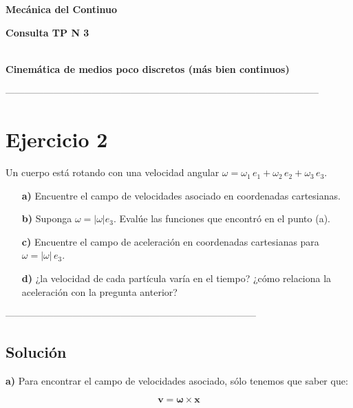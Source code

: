 \documentclass[10pt,a4paper]{article}
\begin{document}
\begin{center}
\bf{Mecánica del Continuo} \vspace*{0.2cm} \linebreak
\vspace{0.050cm}
\begin{Large}\bf{Consulta TP N 3} \end{Large} \vspace*{0.2cm}\\ \bf{Cinemática de medios poco discretos (más bien continuos)}
 \end{center}
\begin{center}
--------------------------------------------------------------------------------------------------
\end{center} 

\section*{Ejercicio 2}


Un cuerpo está rotando con una velocidad angular $\omega = \omega_1 \, e_1 + \omega_2 \, e_2 + \omega_3 \,e_3$.

\begin{itemize}
\item[\textbf{a)}] Encuentre el campo de velocidades asociado en coordenadas cartesianas.
\item[\textbf{b)}] Suponga $\omega = |\omega| e_3$. Evalúe las funciones que encontró en el punto (a).
\item[\textbf{c)}] Encuentre el campo de aceleración en coordenadas cartesianas para \linebreak $\omega = |\omega| \, e_3$.
\item[\textbf{d)}] ¿la velocidad de cada partícula varía en el tiempo? ¿cómo relaciona la aceleración con la pregunta anterior? 
\end{itemize}

\begin{center}------------------------------------------------------------------------------\end{center}

\subsection*{Solución}

\textbf{a)} Para encontrar el campo de velocidades asociado, sólo tenemos que saber que:

\begin{equation}\label{ecvxomega}
\mathbf{v} = \mathbf{\omega} \times \mathbf{x}
\end{equation}
\end{document}
